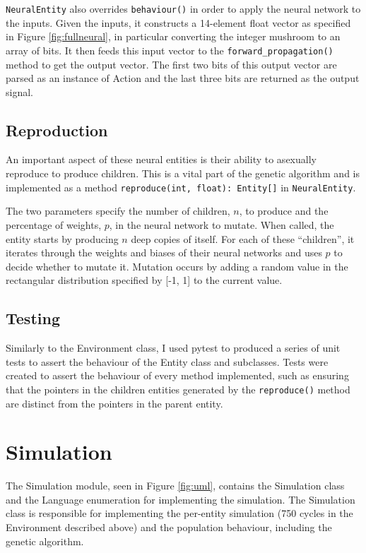 \documentclass[12pt,a4paper,twoside,openright]{report}
\begin{document}
\texttt{NeuralEntity} also overrides \texttt{behaviour()} in order to apply the neural network to the inputs. Given the inputs, it constructs a 14-element float vector as specified in Figure \ref{fig:fullneural}, in particular converting the integer mushroom to an array of bits. It then feeds this input vector to the \texttt{forward\_propagation()} method to get the output vector. The first two bits of this output vector are parsed as an instance of Action and the last three bits are returned as the output signal.

\subsection{Reproduction}

An important aspect of these neural entities is their ability to asexually reproduce to produce children. This is a vital part of the genetic algorithm and is implemented as a method \texttt{reproduce(int, float): Entity[]} in \texttt{NeuralEntity}.

The two parameters specify the number of children, $n$, to produce and the percentage of weights, $p$, in the neural network to mutate. When called, the entity starts by producing $n$ deep copies of itself. For each of these ``children'', it iterates through the weights and biases of their neural networks and uses $p$ to decide whether to mutate it. Mutation occurs by adding a random value in the rectangular distribution specified by [-1, 1] to the current value.

\subsection{Testing}

Similarly to the Environment class, I used pytest to produced a series of unit tests to assert the behaviour of the Entity class and subclasses. Tests were created to assert the behaviour of every method implemented, such as ensuring that the pointers in the children entities generated by the \texttt{reproduce()} method are distinct from the pointers in the parent entity.

\section{Simulation}\label{section:simulation}

The Simulation module, seen in Figure \ref{fig:uml}, contains the Simulation class and the Language enumeration for implementing the simulation. The Simulation class is responsible for implementing the per-entity simulation (750 cycles in the Environment described above) and the population behaviour, including the genetic algorithm.
\end{document}
